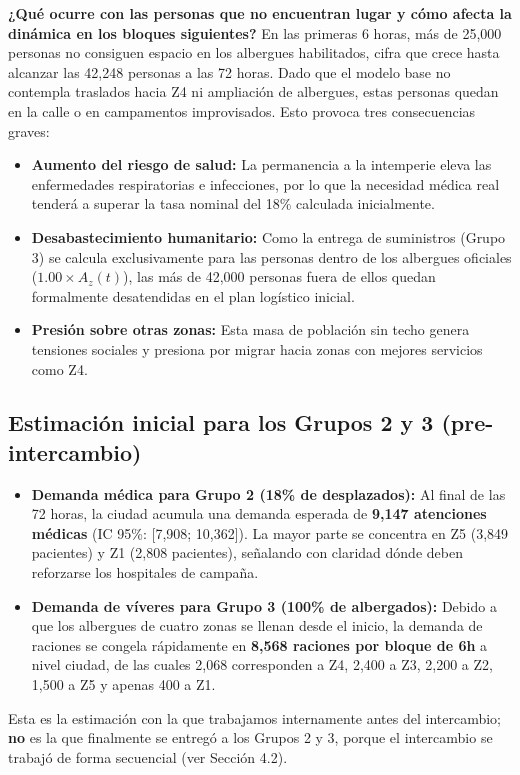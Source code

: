 \documentclass[10pt,letterpaper]{article}
\begin{document}
\textbf{¿Qué ocurre con las personas que no encuentran lugar y cómo afecta la dinámica en los bloques siguientes?}
En las primeras 6 horas, más de 25,000 personas no consiguen espacio en los albergues habilitados, cifra que crece hasta alcanzar las 42,248 personas a las 72 horas. Dado que el modelo base no contempla traslados hacia Z4 ni ampliación de albergues, estas personas quedan en la calle o en campamentos improvisados. Esto provoca tres consecuencias graves:
\begin{itemize}
    \item \textbf{Aumento del riesgo de salud:} La permanencia a la intemperie eleva las enfermedades respiratorias e infecciones, por lo que la necesidad médica real tenderá a superar la tasa nominal del 18\% calculada inicialmente.
    \item \textbf{Desabastecimiento humanitario:} Como la entrega de suministros (Grupo 3) se calcula exclusivamente para las personas dentro de los albergues oficiales ($1.00 \times A_z(t)$), las más de 42,000 personas fuera de ellos quedan formalmente desatendidas en el plan logístico inicial.
    \item \textbf{Presión sobre otras zonas:} Esta masa de población sin techo genera tensiones sociales y presiona por migrar hacia zonas con mejores servicios como Z4.
\end{itemize}

\subsection{Estimación inicial para los Grupos 2 y 3 (pre-intercambio)}
\begin{itemize}
    \item \textbf{Demanda médica para Grupo 2 (18\% de desplazados):} Al final de las 72 horas, la ciudad acumula una demanda esperada de \textbf{9,147 atenciones médicas} (IC 95\%: [7,908; 10,362]). La mayor parte se concentra en Z5 (3,849 pacientes) y Z1 (2,808 pacientes), señalando con claridad dónde deben reforzarse los hospitales de campaña.
    \item \textbf{Demanda de víveres para Grupo 3 (100\% de albergados):} Debido a que los albergues de cuatro zonas se llenan desde el inicio, la demanda de raciones se congela rápidamente en \textbf{8,568 raciones por bloque de 6h} a nivel ciudad, de las cuales 2,068 corresponden a Z4, 2,400 a Z3, 2,200 a Z2, 1,500 a Z5 y apenas 400 a Z1.
\end{itemize}
Esta es la estimación con la que trabajamos internamente antes del intercambio; \textbf{no} es la que finalmente se entregó a los Grupos 2 y 3, porque el intercambio se trabajó de forma secuencial (ver Sección 4.2).
\end{document}
